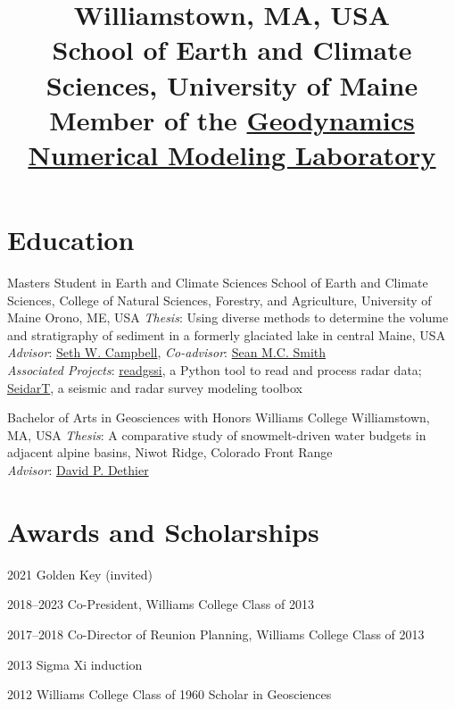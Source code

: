 \documentclass[a4paper,12pt,sans,colorlinks]{moderncv}
\title{%
    \small
    Williamstown, MA, USA
    \\
    School of Earth and Climate Sciences, University of Maine
    \\
    Member of the
    \href{http://wiki.geodynamics.umaine.edu/}{Geodynamics Numerical Modeling Laboratory}
}
\newcommand{\seth}{\href{https://www.alpinesciences.net}{Seth W. Campbell}}
\newcommand{\sean}{\href{https://umaine.edu/earthclimate/people/sean-m-c-smith/}{Sean M.C. Smith}}
\newcommand{\david}{\href{https://geosciences.williams.edu/profile/ddethier/}{David P. Dethier}}
\newcommand{\rsudp}{\href{https://github.com/iannesbitt/readgssi}{readgssi}}
\newcommand{\seidart}{\href{https://github.com/UMainedynamics/SeidarT}{SeidarT}}
\begin{document}

\maketitle
\vspace{-3em}


\section{Education}

{Masters Student in Earth and Climate Sciences}
{School of Earth and Climate Sciences,
College of Natural Sciences, Forestry, and Agriculture,
University of Maine}
{Orono, ME, USA}
{}
{
    \emph{Thesis}: Using diverse methods to determine the volume and stratigraphy
    of sediment in a formerly glaciated lake in central Maine, USA
    \\
    \emph{Advisor}: \seth{}, \emph{Co-advisor}: \sean{}
    \\
    \emph{Associated Projects}: \rsudp{}, a Python tool to read and process radar data;
    \seidart{}, a seismic and radar survey modeling toolbox
}

{Bachelor of Arts in Geosciences with Honors}
{Williams College}
{Williamstown, MA, USA}
{}
{
    \emph{Thesis}: A comparative study of snowmelt-driven water budgets in
    adjacent alpine basins, Niwot Ridge, Colorado Front Range
    \\
    \emph{Advisor}: \david{}
}


\section{Awards and Scholarships}

\cvline
{2021}
{Golden Key (invited)}

\cvline
{2018--2023}
{Co-President, Williams College Class of 2013}

\cvline
{2017--2018}
{Co-Director of Reunion Planning, Williams College Class of 2013}

\cvline
{2013}
{Sigma Xi induction}

\cvline
{2012}
{Williams College Class of 1960 Scholar in Geosciences}
\end{document}
